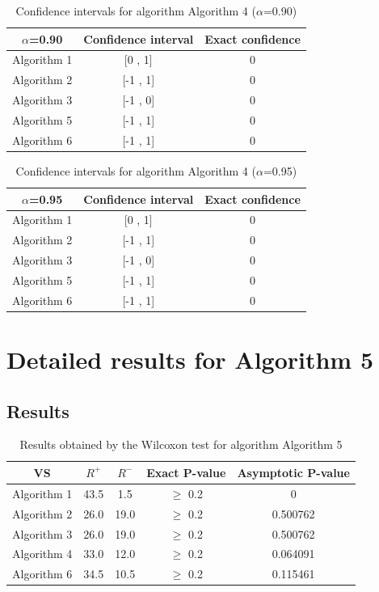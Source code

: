 \documentclass[a4paper,10pt]{article}
\begin{document}
\begin{table}[!htp]
\centering\small
\begin{tabular}{
|c|c|c|}
\hline
 $\alpha$=0.90 & Confidence interval & Exact confidence \\ \hline 
Algorithm 1 & [0 , 1] & 0\\ \hline 
Algorithm 2 & [-1 , 1] & 0\\ \hline 
Algorithm 3 & [-1 , 0] & 0\\ \hline 
Algorithm 5 & [-1 , 1] & 0\\ \hline 
Algorithm 6 & [-1 , 1] & 0\\ \hline 

\end{tabular}
\caption{Confidence intervals for algorithm Algorithm 4 ($\alpha$=0.90)}
\end{table}
\begin{table}[!htp]
\centering\small
\begin{tabular}{
|c|c|c|}
\hline
 $\alpha$=0.95 & Confidence interval & Exact confidence \\ \hline 
Algorithm 1 & [0 , 1] & 0\\ \hline 
Algorithm 2 & [-1 , 1] & 0\\ \hline 
Algorithm 3 & [-1 , 0] & 0\\ \hline 
Algorithm 5 & [-1 , 1] & 0\\ \hline 
Algorithm 6 & [-1 , 1] & 0\\ \hline 

\end{tabular}
\caption{Confidence intervals for algorithm Algorithm 4 ($\alpha$=0.95)}
\end{table}

 \clearpage 


\section{Detailed results for Algorithm 5}


\subsection{Results}

\begin{table}[!htp]
\centering\small
\begin{tabular}{
|c|c|c|c|c|}
\hline
 VS & $R^{+}$ & $R^{-}$ & Exact P-value & Asymptotic P-value \\ \hline 
Algorithm 1 & 43.5 & 1.5 & $\geq$ 0.2 & 0\\ \hline 
Algorithm 2 & 26.0 & 19.0 & $\geq$ 0.2 & 0.500762\\ \hline 
Algorithm 3 & 26.0 & 19.0 & $\geq$ 0.2 & 0.500762\\ \hline 
Algorithm 4 & 33.0 & 12.0 & $\geq$ 0.2 & 0.064091\\ \hline 
Algorithm 6 & 34.5 & 10.5 & $\geq$ 0.2 & 0.115461\\ \hline 

\end{tabular}
\caption{Results obtained by the Wilcoxon test for algorithm Algorithm 5}
\end{table}
\end{document}
